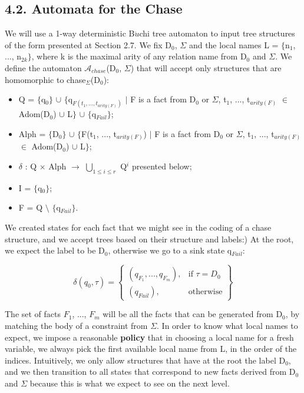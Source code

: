 \documentclass[11pt, a4paper, dvipsnames]{article}
\begin{document}
\subsection{4.2. Automata for the Chase}
We will use a 1-way deterministic B$\ddot{u}$chi tree automaton to input tree structures of the form presented at Section 2.7. We fix D$_{0}$, $\Sigma$ and the local names L = $\{$n$_{1}$, ..., n$_{2k}\}$, where k is the maximal arity of any relation name from D$_{0}$ and $\Sigma$. We define the automaton $\mathcal{A}_{chase}$(D$_{0}$, $\Sigma$) that will accept only structures that are homomorphic to chase$_{\Sigma}$(D$_{0}$):
\begin{itemize}
	\item Q = $\{$q$_{0}\}$ $\cup$ $\{$q$_{F(t_{1}, ..., t_{arity(F)})}$ $|$ F is a fact from D$_{0}$ or $\Sigma$, t$_{1}$, ..., t$_{arity(F)}$ $\in$ Adom(D$_{0}$) $\cup$ L$\}$ $\cup$ $\{$q$_{Fail}\}$;
	\item Alph = $\{$D$_{0}\}$ $\cup$ $\{$F(t$_{1}$, ..., t$_{arity(F)}$) $|$ F is a fact from D$_{0}$ or $\Sigma$, t$_{1}$, ..., t$_{arity(F)}$ $\in$ Adom(D$_{0}$) $\cup$ L$\}$;
	\item $\delta$ : Q $\times$ Alph $\rightarrow$ $\bigcup_{1 \leq i \leq r}$ Q$^{i}$ presented below;
	\item I = $\{$q$_{0}\}$;
	\item F = Q $\setminus$ $\{$q$_{Fail}\}$.
\end{itemize}
We created states for each fact that we might see in the coding of a chase structure, and we accept trees based on their structure and labels:) At the root, we expect the label to be D$_{0}$, otherwise we go to a sink state q$_{Fail}$:
\begin{center}
\[\delta(q_{0},\tau) = \left\{\begin{array}{lr}
        (q_{F_{1}}, ..., q_{F_{m}}), & \text{if } \tau = D_{0}\\
        (q_{Fail}), & \text{otherwise} 
        \end{array}\right\}
  \] 
\end{center}
The set of facts $F_{1}$, ..., $F_{m}$ will be all the facts that can be generated from D$_{0}$, by matching the body of a constraint from $\Sigma$. In order to know what local names to expect, we impose a reasonable \textbf{policy} that in choosing a local name for a fresh variable, we always pick the first available local name from L, in the order of the indices. Intuitively, we only allow structures that have at the root the label D$_{0}$, and we then transition to all states that correspond to new facts derived from D$_{0}$ and $\Sigma$ because this is what we expect to see on the next level.\newline
\end{document}

